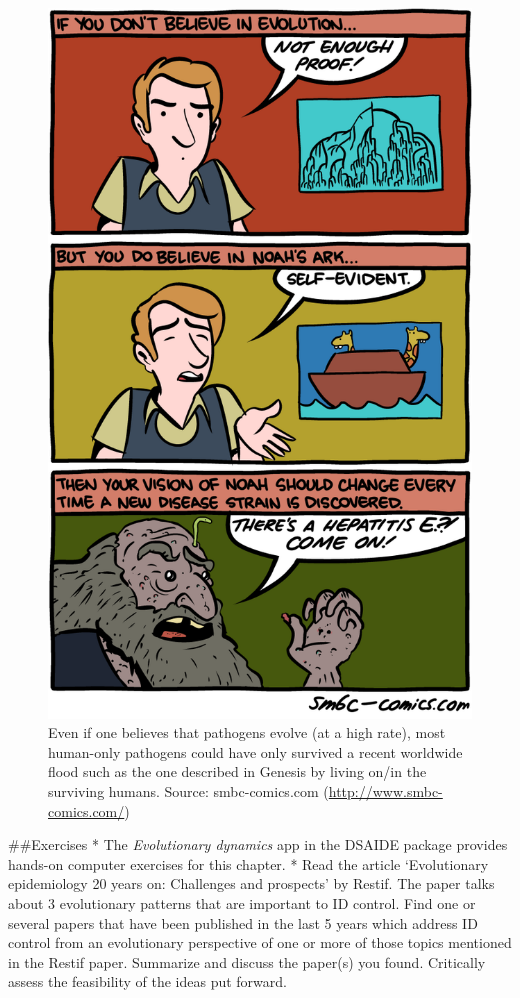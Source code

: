 \documentclass[]{book}
\theoremstyle{definition}
\theoremstyle{definition}
\theoremstyle{definition}
\theoremstyle{remark}
\begin{document}
\begin{figure}
\centering
\includegraphics{./images/smbc-ID-evolution.png}
\caption{Even if one believes that pathogens evolve (at a high rate),
most human-only pathogens could have only survived a recent worldwide
flood such as the one described in Genesis by living on/in the surviving
humans. Source: smbc-comics.com (\url{http://www.smbc-comics.com/})}
\end{figure}

\#\#Exercises * The \emph{Evolutionary dynamics} app in the DSAIDE
package provides hands-on computer exercises for this chapter. * Read
the article `Evolutionary epidemiology 20 years on: Challenges and
prospects' by Restif. The paper talks about 3 evolutionary patterns that
are important to ID control. Find one or several papers that have been
published in the last 5 years which address ID control from an
evolutionary perspective of one or more of those topics mentioned in the
Restif paper. Summarize and discuss the paper(s) you found. Critically
assess the feasibility of the ideas put forward.
\end{document}

